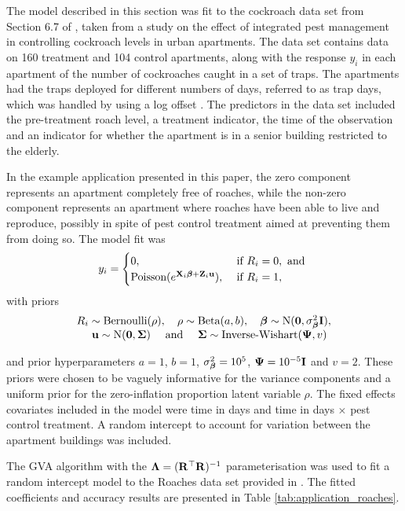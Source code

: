 The model described in this section was fit  to the cockroach data set from
Section 6.7 of \cite{Gelman2007}, taken from a study on the effect of
integrated pest management in controlling cockroach levels in urban apartments.
The data set contains data on 160 treatment and 104 control apartments, along
with the response $y_i$ in each apartment of the number of cockroaches caught
in a set of traps. The apartments had the traps deployed for different numbers
of days, referred to as trap days, which was handled by using a log offset
\citep{Agresti2002}. The predictors in the data set included the pre-treatment
roach level, a treatment indicator, the time of the observation and an
indicator for whether the apartment is in a senior building restricted to the
elderly.
		
In the example application presented in this paper, the zero component
represents an apartment completely free of roaches, while the non-zero
component represents an apartment where roaches have been able to live and
reproduce, possibly in spite of pest control treatment aimed at preventing them
from doing so. The model fit was
\begin{equation*}
    y_i = \begin{cases}
        0, &\text{ if } R_i = 0, \text{ and } \\
        \text{Poisson}(e^{{\bf X}_i {\boldsymbol \beta} + {\bf Z}_i {\bf u}}), & \text{ if } R_i = 1,
	\end{cases}
\end{equation*}
with priors 
$$
\begin{array}{c} 
R_i \sim \text{Bernoulli}(\rho), 
\quad 
\rho \sim \text{Beta}(a, b),
\quad {\boldsymbol\beta} \sim \text{N}({\bf 0}, \sigma^2_{{\boldsymbol \beta}} {\bf I}), 
\\
\quad {\bf u} \sim
\text{N}({\bf 0}, {\boldsymbol \Sigma}) \quad \text{ and } \quad {\boldsymbol\Sigma} \sim
\text{Inverse-Wishart}({\boldsymbol \Psi}, v)
\end{array} 
$$

\noindent and prior hyperparameters $a = 1$, $b = 1$,
$\sigma^2_{\boldsymbol \beta} = 10^5$, ${\boldsymbol \Psi} = 10^{-5} {\bf I}$ and $v = 2$.  These priors were
chosen to be vaguely informative for the variance components and a uniform
prior for the zero-inflation proportion latent variable $\rho$. The fixed
effects covariates included in the model were time in days and time in days
$\times$ pest control treatment. A random intercept to account for variation
between the apartment buildings was included.
		
The GVA algorithm with the ${\boldsymbol \Lambda} = ({\bf R}^\top {\bf R})^{-1}$ parameterisation
was used to fit a random intercept model to the Roaches data set provided in
\cite{Gelman2007}. The fitted coefficients and accuracy results are presented
in Table \ref{tab:application_roaches}.
		
